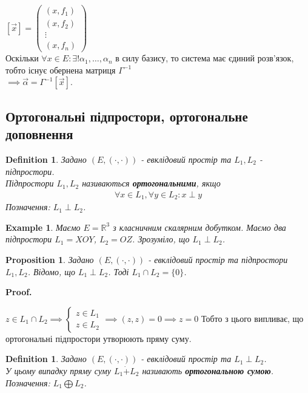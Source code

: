 \documentclass[a4paper, 10pt]{article}
\makeatletter
\def\qed{$\blacksquare$}
\theoremstyle{theoremdd}
\theoremstyle{theoremdd}
\newtheorem{definition}[theorem]{Definition}
\theoremstyle{theoremdd}
\theoremstyle{theoremdd}
\newtheorem{example}[theorem]{Example}
\theoremstyle{theoremdd}
\newtheorem{proposition}[theorem]{Proposition}
\theoremstyle{theoremdd}
\theoremstyle{theoremdd}
\theoremstyle{theoremdd}
\renewenvironment{proof}[1][Proof.\\]{\par
\pushQED{\hfill \qed}%
\normalfont \topsep6\p@\@plus6\p@\relax
\trivlist
\item\relax
{\bfseries
#1\@addpunct{.}}\hspace\labelsep\ignorespaces
}{%
\popQED\endtrivlist\@endpefalse
}
\makeatother
\begin{document}
$[\vec{x}] = \begin{pmatrix}
(x,f_1) \\ (x,f_2) \\ \vdots \\ (x,f_n)
\end{pmatrix}$\\
Оскільки $\forall x \in E: \exists! \alpha_1,\dots,\alpha_n$ в силу базису, то система має єдиний розв'язок, тобто існує обернена матриця $\Gamma^{-1}$\\
$\implies \vec{\alpha} = \Gamma^{-1} [\vec{x}]$.

\subsection{Ортогональні підпростори, ортогональне доповнення}
\begin{definition}
Задано $(E, (\cdot,\cdot))$ - евклідовий простір та $L_1,L_2$ - підпростори.\\
Підпростори $L_1,L_2$ називаються \textbf{ортогональними}, якщо
\begin{align*}
\forall x \in L_1, \forall y \in L_2: x \perp y
\end{align*}
Позначення: $L_1 \perp L_2$.
\end{definition}

\begin{example}
Маємо $E = \mathbb{R}^3$  з класничним скалярним добутком. Маємо два підпростори $L_1 = XOY$, $L_2 = OZ$. Зрозуміло, що $L_1 \perp L_2$.
\end{example}

\begin{proposition}
Задано $(E,(\cdot,\cdot))$ - евклідовий простір та підпростори $L_1,L_2$. Відомо, що
$L_1 \perp L_2$. Тоді $L_1 \cap L_2 = \{0\}$.
\end{proposition}

\begin{proof}
$z \in L_1 \cap L_2 \implies \begin{cases} z \in L_1 \\ z \in L_2 \end{cases} \implies (z,z) = 0 \implies z = 0$
\end{proof}
Тобто з цього випливає, що ортогональні підпростори утворюють пряму суму.

\begin{definition}
Задано $(E, (\cdot,\cdot))$ - евклідовий простір та $L_1 \perp L_2$.\\
У цьому випадку пряму суму $L_1 \dot{+} L_2$ називають \textbf{ортогональною сумою}.\\
Позначення: $L_1 \bigoplus L_2$.
\end{definition}
\end{document}

